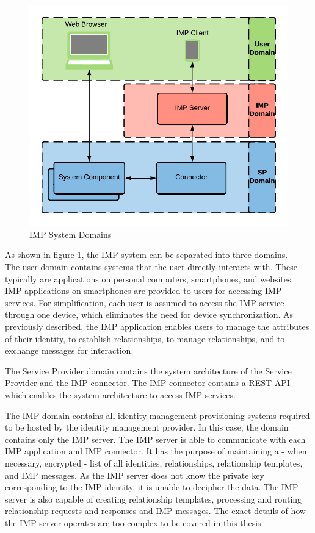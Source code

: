 \begin{figure}[h]
    \centering
    \includegraphics[scale=0.6]{Diagrams/IMP System Overview.pdf}
    \caption{IMP System Domains}
    \label{imp:imp_system_overview}
\end{figure}

As shown in figure \ref{imp:imp_system_overview}, the IMP system can be separated into three domains. \\
The user domain contains systems that the user directly interacts with. These typically are applications on personal computers, smartphones, and websites. IMP applications on smartphones are provided to users for accessing IMP services. For simplification, each user is assumed to access the IMP service through one device, which eliminates the need for device synchronization. As previously described, the IMP application enables users to manage the attributes of their identity, to establish relationships, to manage relationships, and to exchange messages for interaction. 

The Service Provider domain contains the system architecture of the Service Provider and the IMP connector. The IMP connector contains a REST API which enables the system architecture to access IMP services.

The IMP domain contains all identity management provisioning systems required to be hosted by the identity management provider. In this case, the domain contains only the IMP server. The IMP server is able to communicate with each IMP application and IMP connector. It has the purpose of maintaining a - when necessary, encrypted - list of all identities, relationships, relationship templates, and IMP messages. As the IMP server does not know the private key corresponding to the IMP identity, it is unable to decipher the data. The IMP server is also capable of creating relationship templates, processing and routing relationship requests and responses and IMP messages. The exact details of how the IMP server operates are too complex to be covered in this thesis.

